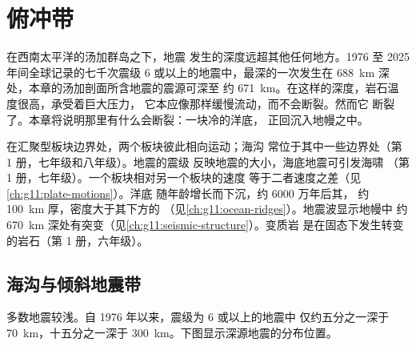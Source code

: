 \chapter{俯冲带}\label{ch:g11:subduction-zones}

在西南太平洋的汤加群岛之下，地震
发生的深度远超其他任何地方。1976 至 2025 年间全球记录的七千次震级
6 或以上的地震中，最深的一次发生在
\qty{688}{km} 深处，本章的汤加剖面所含地震的震源可深至
约 \qty{671}{km}。在这样的深度，岩石温度很高，承受着巨大压力，
它本应像那样缓慢流动，而不会断裂。然而它
断裂了。本章将说明那里有什么会断裂：一块冷的洋底，
正回沉入地幔之中。

\begin{recall}
在汇聚型板块边界处，两个板块彼此相向运动；海沟
常位于其中一些边界处（第 1 册，七年级和八年级）。地震的震级
反映地震的大小，海底地震可引发海啸
（第 1 册，七年级）。一个板块相对另一个板块的速度
等于二者速度之差（见\cref{ch:g11:plate-motions}）。洋底
随年龄增长而下沉，约 6000 万年后其，
约 \qty{100}{km} 厚，密度大于其下方的
（见\cref{ch:g11:ocean-ridges}）。地震波显示地幔中
约 \qty{670}{km} 深处有突变（见\cref{ch:g11:seismic-structure}）。变质岩
是在固态下发生转变的岩石（第 1 册，六年级）。
\end{recall}

\section{海沟与倾斜地震带}

多数地震较浅。自 1976 年以来，震级为 6 或以上的地震中
仅约五分之一深于 \qty{70}{km}，十五分之一深于
\qty{300}{km}。下图显示深源地震的分布位置。

